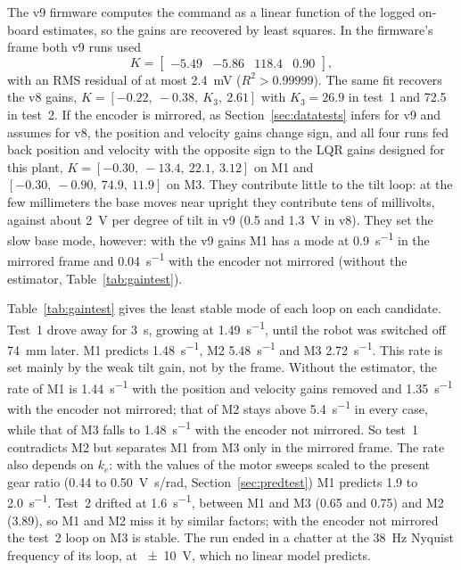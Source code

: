 The v9 firmware computes the command as a linear function of the logged
on-board estimates, so the gains are recovered by least squares. In the
firmware's frame both v9 runs used
\begin{equation*}
K=\begin{bmatrix}-5.49 & -5.86 & 118.4 & 0.90\end{bmatrix},
\end{equation*}
with an RMS residual of at most \SI{2.4}{mV} ($R^2>0.99999$). The same fit
recovers the v8 gains, $K=[-0.22,\ -0.38,\ K_3,\ 2.61]$ with $K_3=26.9$ in
test~1 and 72.5 in test~2. If the encoder is mirrored, as
Section~\ref{sec:datatests} infers for v9 and assumes for v8, the position and
velocity gains change sign, and all four runs fed back position and velocity
with the opposite sign to the LQR gains designed for this plant, $K=[-0.30,\ -13.4,\ 22.1,\ 3.12]$ on M1 and
$[-0.30,\ -0.90,\ 74.9,\ 11.9]$ on M3. They contribute little to the tilt
loop: at the few millimeters the base moves near upright they contribute tens
of millivolts, against about \SI{2}{V} per degree of tilt in v9 (0.5 and
\SI{1.3}{V} in v8). They set the slow base mode, however: with the v9 gains M1
has a mode at \SI{0.9}{s^{-1}} in the mirrored frame and \SI{0.04}{s^{-1}}
with the encoder not mirrored (without the estimator,
Table~\ref{tab:gaintest}).

Table~\ref{tab:gaintest} gives the least stable mode of each loop on each
candidate. Test~1 drove away for \SI{3}{s}, growing at \SI{1.49}{s^{-1}}, until
the robot was switched off \SI{74}{mm} later. M1 predicts \SI{1.48}{s^{-1}}, M2
\SI{5.48}{s^{-1}} and M3 \SI{2.72}{s^{-1}}. This rate is set mainly by the weak
tilt gain, not by the frame. Without the estimator, the rate of M1 is
\SI{1.44}{s^{-1}} with the position and velocity gains removed and
\SI{1.35}{s^{-1}} with the encoder not mirrored; that of M2 stays above
\SI{5.4}{s^{-1}} in every case, while that of M3 falls to \SI{1.48}{s^{-1}}
with the encoder not mirrored. So test~1 contradicts M2 but separates M1 from
M3 only in the mirrored frame. The rate also depends on $k_e$: with the values
of the motor sweeps scaled to the present gear ratio (0.44 to
\SI{0.50}{V.s/rad}, Section~\ref{sec:predtest}) M1 predicts 1.9 to
\SI{2.0}{s^{-1}}. Test~2 drifted at \SI{1.6}{s^{-1}}, between M1 and M3 (0.65
and 0.75) and M2 (3.89), so M1 and M2 miss it by similar factors; with the
encoder not mirrored the test~2 loop on M3 is stable. The run ended in a
chatter at the \SI{38}{Hz} Nyquist frequency of its loop, at \SI{\pm10}{V},
which no linear model predicts.

